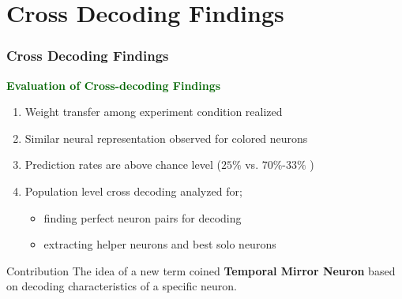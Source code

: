 \documentclass{beamer}
\begin{document}
\section{Cross Decoding Findings }
\begin{frame}
\frametitle{Cross Decoding Findings }

\textcolor{darkgreen}{\textbf{Evaluation of Cross-decoding Findings }}
\begin{enumerate}
\item Weight transfer among experiment condition realized
\item Similar neural representation observed for colored neurons

\item Prediction rates are above chance level ($25\%$ vs. $70\%$-$33\%$ )
\item Population level cross decoding analyzed for;
\begin{itemize}
\item finding perfect neuron pairs for decoding
\item extracting helper neurons and best solo neurons
\end{itemize}
 
\end{enumerate}

\begin{block}{Contribution}
\centering The idea of a new term coined \textbf{Temporal Mirror Neuron} based 
on decoding characteristics of a specific neuron.
\end{block}

\end{frame}
\end{document}
